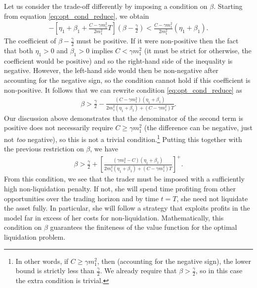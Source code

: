\documentclass[12pt, letterpaper]{article}
\numberwithin{equation}{section}
\numberwithin{theorem}{section}
\begin{document}
Let us consider  the trade-off  differently by imposing a condition on $\beta$. Starting from equation \eqref{eq:opt_cond_reduce}, we obtain
\begin{equation*}
\begin{aligned}
-\left[\eta_1+\beta_1+\frac{C-\gamma m_1^2}{2m_1^2}T\right]\left(\beta-\frac{\gamma}{2}\right)<\frac{C-\gamma m_1^2}{2m_1^2}(\eta_1+\beta_1).
\end{aligned}
\end{equation*}
The coefficient of $\beta-\frac{\gamma}{2}$ must be positive. If it were non-positive then the fact that both $\eta_1>0$ and $\beta_1>0$ implies $C<\gamma m_1^2$ (it must be strict for otherwise, the coefficient would be positive) and so the right-hand side of the inequality is negative. However, the left-hand side would then be non-negative after accounting for the negative sign, so the condition cannot hold if this coefficient is non-positive. It follows that we can rewrite condition \eqref{eq:opt_cond_reduce} as
\begin{equation*}
\begin{aligned}
\beta>\frac{\gamma}{2}-\frac{(C-\gamma m_1^2)(\eta_1+\beta_1)}{2m_1^2(\eta_1+\beta_1)+{(C-\gamma m_1^2)}T}.
\end{aligned}
\end{equation*}
Our discussion above demonstrates that the denominator of the second term is positive does not necessarily require $C\ge\gamma m_1^2$ (the difference can be negative, just not \emph{too} negative), so this is not a trivial condition.\footnote{In other words, if $C\ge\gamma m_1^2$, then (accounting for the negative sign), the lower bound is strictly less than $\frac{\gamma}{2}$. We already require that $\beta>\frac{\gamma}{2}$, so in this case the extra condition is trivial.} Putting this together with the previous restriction on $\beta$, we have
\begin{equation*}
\begin{aligned}
\beta>\frac{\gamma}{2}+\left[\frac{(\gamma m_1^2-C)(\eta_1+\beta_1)}{2m_1^2(\eta_1+\beta_1)+{(C-\gamma m_1^2)}T}\right]^+.
\end{aligned}
\end{equation*}
From this  condition, we see   that the trader must be imposed with a sufficiently high  non-liquidation  penalty. If not, she will spend time profiting from other opportunities over the trading horizon and by time $t=T$, she need not liquidate the asset fully. In particular, she will follow a strategy that exploits profits in the model far in excess of her costs for non-liquidation. Mathematically, this condition on $\beta$ guarantees the finiteness of the value function for the optimal liquidation problem.
\end{document}
